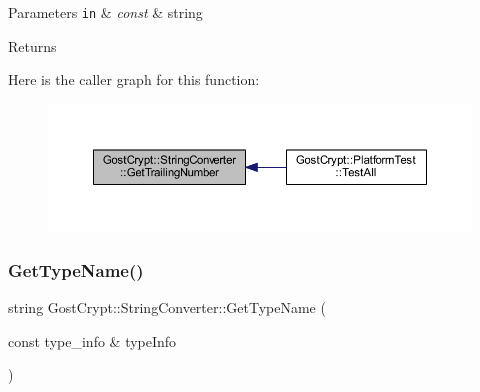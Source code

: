 \begin{DoxyParams}[1]{Parameters}
\mbox{\tt in}  & {\em const} & string \\
\hline
\end{DoxyParams}
\begin{DoxyReturn}{Returns}

\end{DoxyReturn}
Here is the caller graph for this function\+:
\nopagebreak
\begin{figure}[H]
\begin{center}
\leavevmode
\includegraphics[width=350pt]{class_gost_crypt_1_1_string_converter_a90ae47fd725ce6960c4a93ae79a89806_icgraph}
\end{center}
\end{figure}
\mbox{\label{class_gost_crypt_1_1_string_converter_a8f57ff107fac8c923470014d26b9681b}} 
\subsubsection{\texorpdfstring{Get\+Type\+Name()}{GetTypeName()}}
{\footnotesize\ttfamily string Gost\+Crypt\+::\+String\+Converter\+::\+Get\+Type\+Name (\begin{DoxyParamCaption}\item[{const type\+\_\+info \&}]{type\+Info }\end{DoxyParamCaption})\hspace{0.3cm}{\ttfamily [static]}}


